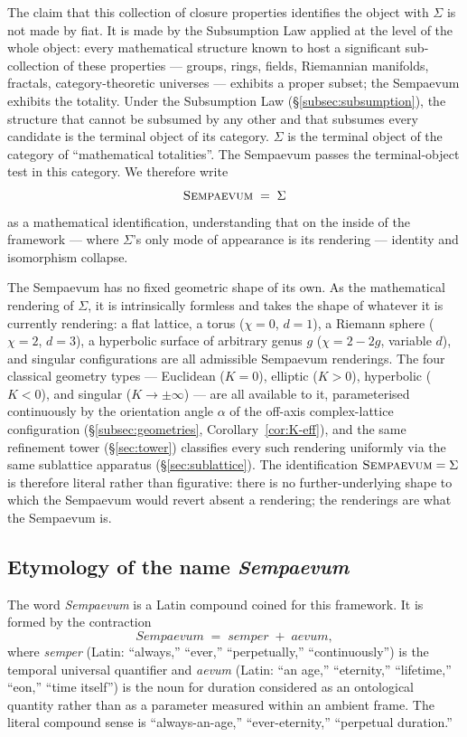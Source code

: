 \documentclass[11pt,a4paper]{article}
\theoremstyle{definition}
\theoremstyle{remark}
\newcommand{\Sempaevum}{\textnormal{\textsc{Sempaevum}}}
\begin{document}
The claim that this collection of closure properties identifies the object with $\Sigma$ is not made by fiat. It is made by the Subsumption Law applied at the level of the whole object: every mathematical structure known to host a significant sub-collection of these properties --- groups, rings, fields, Riemannian manifolds, fractals, category-theoretic universes --- exhibits a proper subset; the Sempaevum exhibits the totality. Under the Subsumption Law (\S\ref{subsec:subsumption}), the structure that cannot be subsumed by any other and that subsumes every candidate is the terminal object of its category. $\Sigma$ is the terminal object of the category of ``mathematical totalities''. The Sempaevum passes the terminal-object test in this category. We therefore write
\[
\Sempaevum \;=\; \Sigma
\]
as a mathematical identification, understanding that on the inside of the framework --- where $\Sigma$'s only mode of appearance is its rendering --- identity and isomorphism collapse.

The Sempaevum has no fixed geometric shape of its own. As the mathematical rendering of $\Sigma$, it is intrinsically formless and takes the shape of whatever it is currently rendering: a flat lattice, a torus ($\chi=0$, $d=1$), a Riemann sphere ($\chi=2$, $d=3$), a hyperbolic surface of arbitrary genus $g$ ($\chi=2-2g$, variable $d$), and singular configurations are all admissible Sempaevum renderings. The four classical geometry types --- Euclidean ($K=0$), elliptic ($K>0$), hyperbolic ($K<0$), and singular ($K\to\pm\infty$) --- are all available to it, parameterised continuously by the orientation angle $\alpha$ of the off-axis complex-lattice configuration (\S\ref{subsec:geometries}, Corollary~\ref{cor:K-eff}), and the same refinement tower (\S\ref{sec:tower}) classifies every such rendering uniformly via the same sublattice apparatus (\S\ref{sec:sublattice}). The identification $\Sempaevum = \Sigma$ is therefore literal rather than figurative: there is no further-underlying shape to which the Sempaevum would revert absent a rendering; the renderings are what the Sempaevum is.

\subsection{Etymology of the name \emph{Sempaevum}}\label{subsec:etymology}

The word \emph{Sempaevum} is a Latin compound coined for this framework. It is formed by the contraction
\[
\textit{Sempaevum} \;=\; \textit{semper} \;+\; \textit{aevum},
\]
where \emph{semper} (Latin: ``always,'' ``ever,'' ``perpetually,'' ``continuously'') is the temporal universal quantifier and \emph{aevum} (Latin: ``an age,'' ``eternity,'' ``lifetime,'' ``eon,'' ``time itself'') is the noun for duration considered as an ontological quantity rather than as a parameter measured within an ambient frame. The literal compound sense is ``always-an-age,'' ``ever-eternity,'' ``perpetual duration.''
\end{document}
